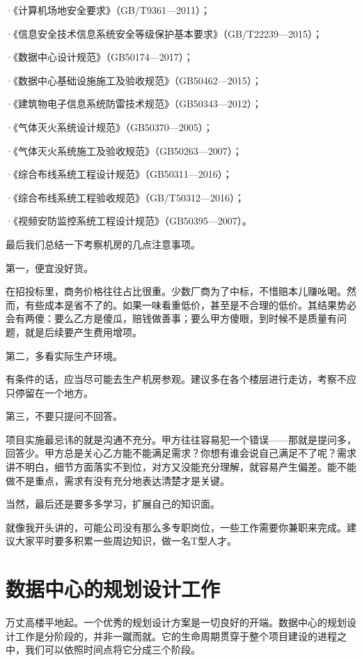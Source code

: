 \documentclass[12pt,UTF8]{ctexbook}
\begin{document}
·《计算机场地安全要求》（GB/T9361—2011）；

·《信息安全技术信息系统安全等级保护基本要求》（GB/T22239—2015）；

·《数据中心设计规范》（GB50174—2017）；

·《数据中心基础设施施工及验收规范》（GB50462—2015）；

·《建筑物电子信息系统防雷技术规范》（GB50343—2012）；

·《气体灭火系统设计规范》（GB50370—2005）；

·《气体灭火系统施工及验收规范》（GB50263—2007）；

·《综合布线系统工程设计规范》（GB50311—2016）；

·《综合布线系统工程验收规范》（GB/T50312—2016）；

·《视频安防监控系统工程设计规范》（GB50395—2007）。

最后我们总结一下考察机房的几点注意事项。

第一，便宜没好货。

在招投标里，商务价格往往占比很重。少数厂商为了中标，不惜赔本儿赚吆喝。然而，有些成本是省不了的。如果一味看重低价，甚至是不合理的低价。其结果势必会有两傻：要么乙方是傻瓜，赔钱做善事；要么甲方傻眼，到时候不是质量有问题，就是后续要产生费用增项。

第二，多看实际生产环境。

有条件的话，应当尽可能去生产机房参观。建议多在各个楼层进行走访，考察不应只停留在一个地方。

第三，不要只提问不回答。

项目实施最忌讳的就是沟通不充分。甲方往往容易犯一个错误——那就是提问多，回答少。甲方总是关心乙方能不能满足需求？你想有谁会说自己满足不了呢？需求讲不明白，细节方面落实不到位，对方又没能充分理解，就容易产生偏差。能不能做不是重点，需求有没有充分地表达清楚才是关键。

当然，最后还是要多多学习，扩展自己的知识面。

就像我开头讲的，可能公司没有那么多专职岗位，一些工作需要你兼职来完成。建议大家平时要多积累一些周边知识，做一名T型人才。

\chapter{数据中心的规划设计工作}

万丈高楼平地起。一个优秀的规划设计方案是一切良好的开端。数据中心的规划设计工作是分阶段的，并非一蹴而就。它的生命周期贯穿于整个项目建设的进程之中，我们可以依照时间点将它分成三个阶段。
\end{document}
